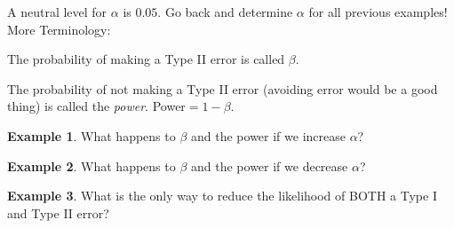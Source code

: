 \documentclass[12pt]{amsart}
\theoremstyle{definition}
\newtheorem{ex}{Example}
\begin{document}
 A neutral level for $\alpha$ is $0.05$. Go back and determine $\alpha$ for all previous examples!
 \newpage
 More Terminology:
 \begin{framed}
  The probability of making a Type II error is called $\beta$.
  
  The probability of not making a Type II error (avoiding error would be a good thing) is called the \emph{power}. Power$=1-\beta$.
 \end{framed}
 
 \begin{ex} What happens to $\beta$ and the power if we increase $\alpha$?
 \end{ex}
 
 \vspace{1in}

  \begin{ex} What happens to $\beta$ and the power if we decrease $\alpha$?
 \end{ex}
 
 \vspace{1in}

 \begin{ex} What is the only way to reduce the likelihood of BOTH a Type I and Type II error?\end{ex}
 
\end{document}
